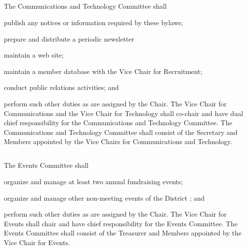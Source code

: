 \subsection{} \label{comms-tech-committee}
The Communications and Technology Committee shall
\begin{inlinealphalist}
    \item publish any notices or information required by these bylaws;
    \item prepare and distribute a periodic newsletter
    \item maintain a web site;
    \item maintain a member database with the Vice Chair for Recruitment;
    \item conduct public relations activities; and
    \item perform such other duties as are assigned by the Chair. The Vice Chair for Communications and the Vice Chair for Technology shall co-chair and have dual chief responsibility for the Communications and Technology Committee. The Communications and Technology Committee shall consist of the Secretary and Members appointed by the Vice Chairs for Communications and Technology.
\end{inlinealphalist}

\subsection{} \label{events-committee}
The Events Committee shall
\begin{inlinealphalist}
    \item organize and manage at least two annual fundraising events;
    \item organize and manage other non-meeting events of the \fortythird{} District ; and
    \item perform such other duties as are assigned by the Chair. The Vice Chair for Events shall chair and have chief responsibility for the Events Committee. The Events Committee shall consist of the Treasurer and Members appointed by the Vice Chair for Events.
\end{inlinealphalist}

